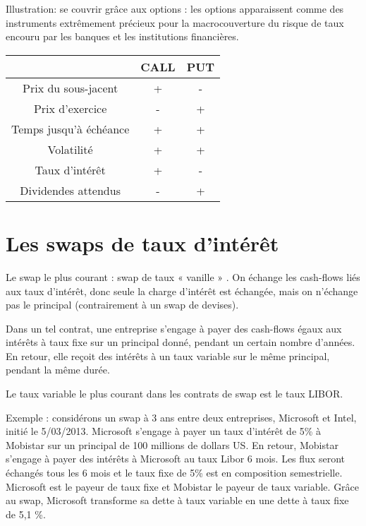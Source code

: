 Illustration: se couvrir grâce aux options : les options apparaissent comme des instruments extrêmement précieux pour la macrocouverture du risque de taux encouru par les banques et les institutions financières.

\begin{center}
\begin{tabular}{|c|c|c|}
\hline 
  & CALL & PUT \\ 
\hline 
Prix du sous-jacent & + & - \\ 
\hline 
Prix d'exercice & - & + \\ 
\hline 
Temps jusqu'à échéance & + & + \\ 
\hline 
Volatilité & + & + \\ 
\hline 
Taux d'intérêt & + & - \\ 
\hline 
Dividendes attendus & - & + \\ 
\hline 
\end{tabular} 
\end{center}


\section{Les swaps de taux d'intérêt}

Le swap le plus courant : swap de taux « vanille » . On échange les cash-flows liés aux taux d'intérêt, donc seule la charge d'intérêt est échangée, mais on n'échange pas le principal (contrairement à un swap de devises).

Dans un tel contrat, une entreprise s'engage à payer des cash-flows égaux aux intérêts à taux fixe sur un principal donné, pendant un certain nombre d'années. En retour, elle reçoit des intérêts à un taux variable sur le même principal, pendant la même durée. 

Le taux variable le plus courant dans les contrats de swap est le taux LIBOR. 

Exemple : considérons un swap à 3 ans entre deux entreprises, Microsoft et Intel, initié le 5/03/2013. Microsoft s’engage à payer un taux d'intérêt de 5\% à Mobistar sur un principal de 100 millions de dollars US. En retour, Mobistar s'engage à payer des intérêts à Microsoft au taux Libor 6 mois. Les flux seront échangés tous les 6 mois et le taux fixe de 5\% est en composition semestrielle. Microsoft est le payeur de taux fixe et Mobistar le payeur de taux variable. Grâce au swap, Microsoft transforme sa dette à taux variable en une dette à taux fixe de 5,1 \%.


